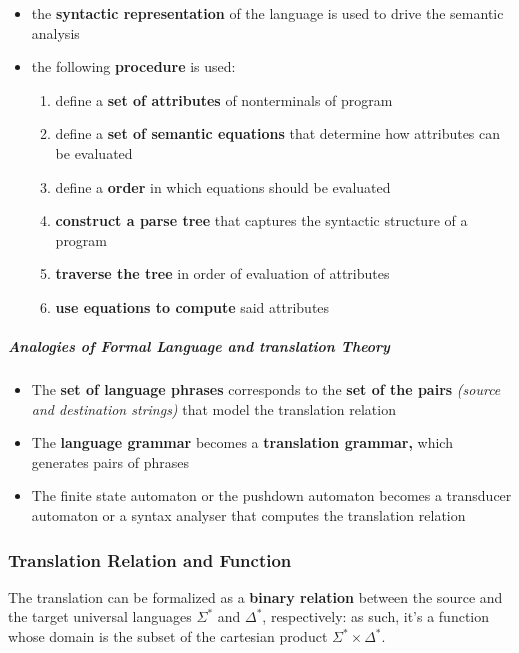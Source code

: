 \documentclass[english]{article}
\begin{document}
\begin{itemize}
  \item the \textbf{syntactic representation} of the language is used to drive the semantic analysis
  \item the following \textbf{procedure} is used:
        \begin{enumerate}
          \item define a \textbf{set of attributes} of nonterminals of program
          \item define a \textbf{set of semantic equations} that determine how attributes can be evaluated
          \item define a \textbf{order} in which equations should be evaluated
          \item \textbf{construct a parse tree} that captures the syntactic structure of a program
          \item \textbf{traverse the tree }in order of evaluation of attributes
          \item \textbf{use equations to compute} said attributes
        \end{enumerate}
\end{itemize}

\bigskip
\subparagraph*{Analogies of Formal Language and translation Theory}

\begin{itemize}
  \item The \textbf{set of language phrases} corresponds to the \textbf{set of the pairs} \textit{(source and destination strings)} that model the translation relation
  \item The \textbf{language grammar} becomes a \textbf{translation grammar,} which generates pairs of phrases
  \item The finite state automaton or the pushdown automaton becomes a transducer automaton or a syntax analyser that computes the translation relation
\end{itemize}

\subsubsection{Translation Relation and Function}

The translation can be formalized as a \textbf{binary relation} between the source and the target universal languages \(\Sigma^\ast\) and \(\Delta^\ast\), respectively:
as such, it's a function whose domain is the subset of the cartesian product \(\Sigma^\ast \times \Delta^\ast\).
\end{document}
